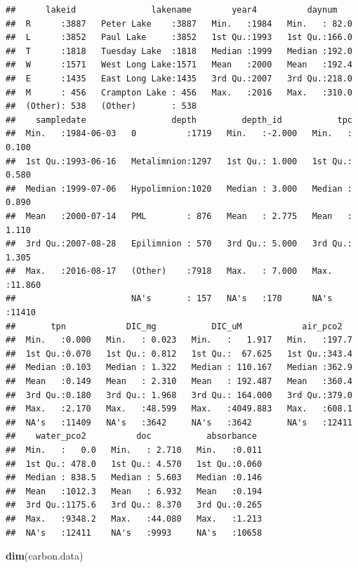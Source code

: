 \documentclass[12pt,]{article}
\newenvironment{Shaded}{\begin{snugshade}}{\end{snugshade}}
\newcommand{\KeywordTok}[1]{\textcolor[rgb]{0.13,0.29,0.53}{\textbf{#1}}}
\newcommand{\NormalTok}[1]{#1}
\begin{document}
\begin{verbatim}
##      lakeid               lakename        year4          daynum     
##  R      :3887   Peter Lake    :3887   Min.   :1984   Min.   : 82.0  
##  L      :3852   Paul Lake     :3852   1st Qu.:1993   1st Qu.:166.0  
##  T      :1818   Tuesday Lake  :1818   Median :1999   Median :192.0  
##  W      :1571   West Long Lake:1571   Mean   :2000   Mean   :192.4  
##  E      :1435   East Long Lake:1435   3rd Qu.:2007   3rd Qu.:218.0  
##  M      : 456   Crampton Lake : 456   Max.   :2016   Max.   :310.0  
##  (Other): 538   (Other)       : 538                                 
##    sampledate                 depth         depth_id           tpc        
##  Min.   :1984-06-03   0          :1719   Min.   :-2.000   Min.   : 0.100  
##  1st Qu.:1993-06-16   Metalimnion:1297   1st Qu.: 1.000   1st Qu.: 0.580  
##  Median :1999-07-06   Hypolimnion:1020   Median : 3.000   Median : 0.890  
##  Mean   :2000-07-14   PML        : 876   Mean   : 2.775   Mean   : 1.110  
##  3rd Qu.:2007-08-28   Epilimnion : 570   3rd Qu.: 5.000   3rd Qu.: 1.305  
##  Max.   :2016-08-17   (Other)    :7918   Max.   : 7.000   Max.   :11.860  
##                       NA's       : 157   NA's   :170      NA's   :11410   
##       tpn            DIC_mg           DIC_uM            air_pco2    
##  Min.   :0.000   Min.   : 0.023   Min.   :   1.917   Min.   :197.7  
##  1st Qu.:0.070   1st Qu.: 0.812   1st Qu.:  67.625   1st Qu.:343.4  
##  Median :0.103   Median : 1.322   Median : 110.167   Median :362.9  
##  Mean   :0.149   Mean   : 2.310   Mean   : 192.487   Mean   :360.4  
##  3rd Qu.:0.180   3rd Qu.: 1.968   3rd Qu.: 164.000   3rd Qu.:379.0  
##  Max.   :2.170   Max.   :48.599   Max.   :4049.883   Max.   :608.1  
##  NA's   :11409   NA's   :3642     NA's   :3642       NA's   :12411  
##    water_pco2          doc           absorbance   
##  Min.   :   0.0   Min.   : 2.710   Min.   :0.011  
##  1st Qu.: 478.0   1st Qu.: 4.570   1st Qu.:0.060  
##  Median : 838.5   Median : 5.603   Median :0.146  
##  Mean   :1012.3   Mean   : 6.932   Mean   :0.194  
##  3rd Qu.:1175.6   3rd Qu.: 8.370   3rd Qu.:0.265  
##  Max.   :9348.2   Max.   :44.080   Max.   :1.213  
##  NA's   :12411    NA's   :9993     NA's   :10658
\end{verbatim}

\begin{Shaded}
\begin{Highlighting}[]
\KeywordTok{dim}\NormalTok{(carbon.data)}
\end{Highlighting}
\end{Shaded}
\end{document}
